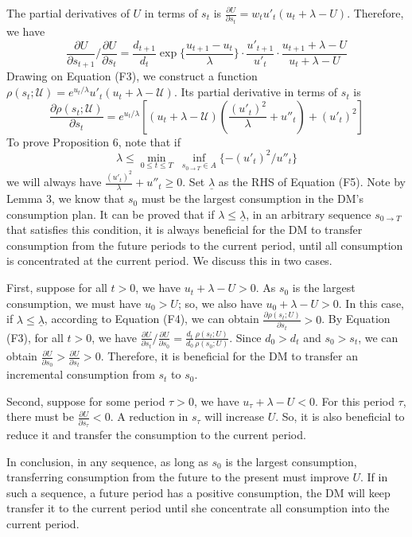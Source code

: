 The partial derivatives of \(U\) in terms of \(s_t\) is
\(\frac{\partial U}{\partial s_t}=w_tu'_t(u_t+\lambda-U)\). Therefore,
we have \[\tag{F3}
\frac{\partial U}{\partial s_{t+1}}/\frac{\partial U}{\partial s_t} = 
\frac{d_{t+1}}{d_t} \exp\{\frac{u_{t+1}-u_t}{\lambda}\}
\cdot\frac{u'_{t+1}}{u'_t}
\cdot\frac{u_{t+1}+\lambda-U}{u_t+\lambda-U}
\]Drawing on Equation (F3), we construct a function
\(\rho(s_t;\mathcal{U})=e^{u_t/\lambda}u'_t(u_t+\lambda-\mathcal{U})\).
Its partial derivative in terms of \(s_t\) is\[\tag{F4}
\frac{\partial \rho(s_t;\mathcal{U})}{\partial s_t} = 
e^{u_t/\lambda}[
(u_t+\lambda-\mathcal{U})(\frac{(u'_t)^2}{\lambda}+u''_t)
+(u'_t)^2]
\]To prove Proposition 6, note that if\[\tag{F5}
\lambda\leq \min_{0 \leq t \leq T} \;\inf_{s_{0\rightarrow T}\in A}\{-(u'_t)^2/u''_t\}
\]we will always have \(\frac{(u'_t)^2}{\lambda}+u''_t \geq 0\). Set
\(\underline{\lambda}\) as the RHS of Equation (F5). Note by Lemma 3, we
know that \(s_0\) must be the largest consumption in the DM's
consumption plan. It can be proved that if
\(\lambda\leq \underline{\lambda}\), in an arbitrary sequence
\(s_{0\rightarrow T}\) that satisfies this condition, it is always
beneficial for the DM to transfer consumption from the future periods to
the current period, until all consumption is concentrated at the current
period. We discuss this in two cases.

First, suppose for all \(t>0\), we have \(u_t+\lambda -U>0\). As \(s_0\)
is the largest consumption, we must have \(u_0>U\); so, we also have
\(u_0+\lambda-U>0\). In this case, if
\(\lambda\leq \underline{\lambda}\), according to Equation (F4), we can
obtain \(\frac{\partial \rho(s_t;U)}{\partial s_t}>0\). By Equation
(F3), for all \(t>0\), we have
\(\frac{\partial U}{\partial s_t}/\frac{\partial U}{\partial s_0}=\frac{d_{t}}{d_0} \frac{\rho(s_t;U)}{\rho(s_0;U)}\).
Since \(d_0>d_t\) and \(s_0>s_t\), we can obtain
\(\frac{\partial U}{\partial s_0}>\frac{\partial U}{\partial s_t}>0\).
Therefore, it is beneficial for the DM to transfer an incremental
consumption from \(s_t\) to \(s_0\).

Second, suppose for some period \(\tau>0\), we have
\(u_\tau+\lambda-U< 0\). For this period \(\tau\), there must be
\(\frac{\partial U}{\partial s_\tau}<0\). A reduction in \(s_\tau\) will
increase \(U\). So, it is also beneficial to reduce it and transfer the
consumption to the current period.

In conclusion, in any sequence, as long as \(s_0\) is the largest
consumption, transferring consumption from the future to the present
must improve \(U\). If in such a sequence, a future period has a
positive consumption, the DM will keep transfer it to the current period
until she concentrate all consumption into the current period.

